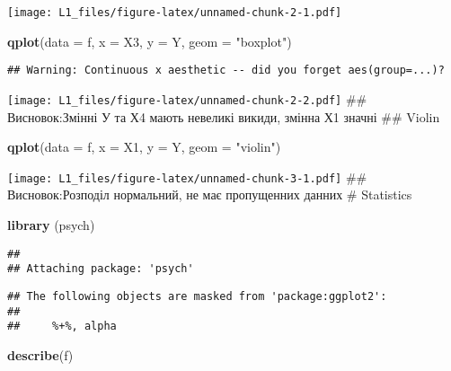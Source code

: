 \documentclass[]{article}
\newenvironment{Shaded}{\begin{snugshade}}{\end{snugshade}}
\newcommand{\KeywordTok}[1]{\textcolor[rgb]{0.13,0.29,0.53}{\textbf{#1}}}
\newcommand{\DataTypeTok}[1]{\textcolor[rgb]{0.13,0.29,0.53}{#1}}
\newcommand{\StringTok}[1]{\textcolor[rgb]{0.31,0.60,0.02}{#1}}
\newcommand{\NormalTok}[1]{#1}
\begin{document}
\texttt{[image: L1\_files/figure-latex/unnamed-chunk-2-1.pdf]}

\begin{Shaded}
\begin{Highlighting}[]
\KeywordTok{qplot}\NormalTok{(}\DataTypeTok{data =}\NormalTok{ f, }
      \DataTypeTok{x =}\NormalTok{ X3, }
      \DataTypeTok{y =}\NormalTok{ Y, }
      \DataTypeTok{geom =} \StringTok{"boxplot"}\NormalTok{)}
\end{Highlighting}
\end{Shaded}

\begin{verbatim}
## Warning: Continuous x aesthetic -- did you forget aes(group=...)?
\end{verbatim}

\texttt{[image: L1\_files/figure-latex/unnamed-chunk-2-2.pdf]} \#\#
Висновок:Змінні У та Х4 мають невеликі викиди, змінна Х1 значні \#\#
Violin

\begin{Shaded}
\begin{Highlighting}[]
\KeywordTok{qplot}\NormalTok{(}\DataTypeTok{data =}\NormalTok{ f, }
      \DataTypeTok{x =}\NormalTok{ X1, }
      \DataTypeTok{y =}\NormalTok{ Y, }
      \DataTypeTok{geom =} \StringTok{"violin"}\NormalTok{)}
\end{Highlighting}
\end{Shaded}

\texttt{[image: L1\_files/figure-latex/unnamed-chunk-3-1.pdf]} \#\#
Висновок:Розподіл нормальний, не має пропущенних данних \# Statistics

\begin{Shaded}
\begin{Highlighting}[]
\KeywordTok{library}\NormalTok{ (psych)}
\end{Highlighting}
\end{Shaded}

\begin{verbatim}
## 
## Attaching package: 'psych'
\end{verbatim}

\begin{verbatim}
## The following objects are masked from 'package:ggplot2':
## 
##     %+%, alpha
\end{verbatim}

\begin{Shaded}
\begin{Highlighting}[]
\KeywordTok{describe}\NormalTok{(f)}
\end{Highlighting}
\end{Shaded}
\end{document}
